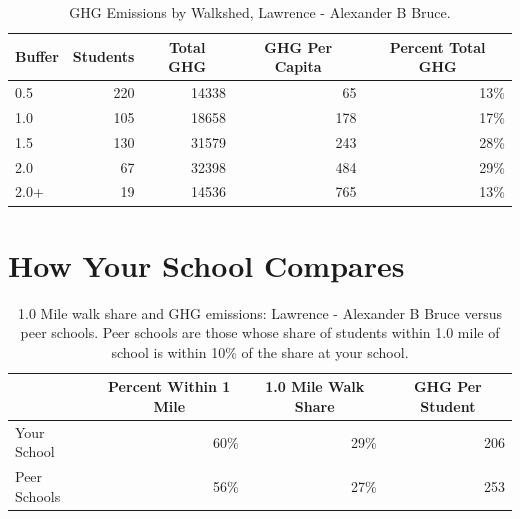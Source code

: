 \documentclass[12pt,letterpaper]{report}\usepackage{graphicx, color}
\begin{document}
%
\begin{table}[H]
\caption{GHG Emissions by Walkshed,  Lawrence - Alexander B Bruce.\label{ghgBufferDFgeneric}} 
\begin{center}
\begin{tabular}{lrrrr}
\hline
\multicolumn{1}{c}{Buffer}&\multicolumn{1}{c}{Students}&\multicolumn{1}{c}{Total GHG}&\multicolumn{1}{c}{GHG Per Capita}&\multicolumn{1}{c}{Percent Total GHG}\tabularnewline
\hline
0.5&220&14338&65&13\%\tabularnewline
1.0&105&18658&178&17\%\tabularnewline
1.5&130&31579&243&28\%\tabularnewline
2.0&67&32398&484&29\%\tabularnewline
2.0+&19&14536&765&13\%\tabularnewline
\hline
\end{tabular}
\end{center}
\end{table}



% 
\section*{How Your School Compares}
%
\begin{table}[H]
\caption{1.0 Mile walk share and GHG emissions: Lawrence - Alexander B Bruce versus peer schools. Peer schools are those 
                                         whose share of students within 1.0 mile of 
                                         school is within 10\% of the share at your 
                                         school.\label{pSaggLatex}} 
\begin{center}
\begin{tabular}{lrrr}
\hline
\multicolumn{1}{c}{}&\multicolumn{1}{c}{Percent Within 1 Mile}&\multicolumn{1}{c}{1.0 Mile Walk Share}&\multicolumn{1}{c}{GHG Per Student}\tabularnewline
\hline
Your School&60\%&29\%&206\tabularnewline
Peer Schools&56\%&27\%&253\tabularnewline
\hline
\end{tabular}
\end{center}
\end{table}
\end{document}
